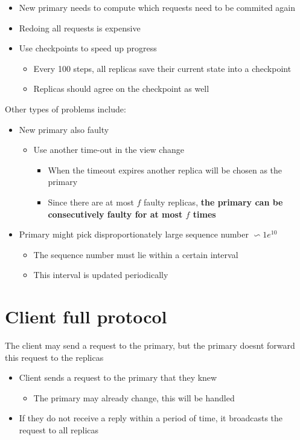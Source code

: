 \documentclass{easyclass}
\begin{document}
\begin{theo}{}
    \begin{itemize}
        \item New primary needs to compute which requests need to be commited again
        \item Redoing all requests is expensive
        \item Use checkpoints to speed up progress
        \begin{itemize}
            \item Every 100 steps, all replicas save their current state into a checkpoint
            \item Replicas should agree on the checkpoint as well
        \end{itemize}
    \end{itemize}
\end{theo}
Other types of problems include:
\begin{itemize}
    \item New primary also faulty
    \begin{itemize}
        \item Use another time-out in the view change
        \begin{itemize}
            \item When the timeout expires another replica will be chosen as the primary
            \item Since there are at most $f$ faulty replicas, \textbf{the primary can be
            consecutively faulty for at most $f$ times}
        \end{itemize}
    \end{itemize}
    \item Primary might pick disproportionately large sequence number $\backsim 1e^{10}$
    \begin{itemize}
        \item The sequence number must lie within a certain interval
        \item This interval is updated periodically
    \end{itemize}
\end{itemize}
\section{Client full protocol}
The client may send a request to the primary, but the primary
doesnt forward this request to the replicas
\begin{theo}{}
    \begin{itemize}
        \item Client sends a request to the primary  that they knew
        \begin{itemize}
            \item The primary may already change, this will be handled
        \end{itemize}
        \item If they do not receive a reply within a period of time, it broadcasts the
        request to all replicas
    \end{itemize}
\end{theo}
\end{document}
